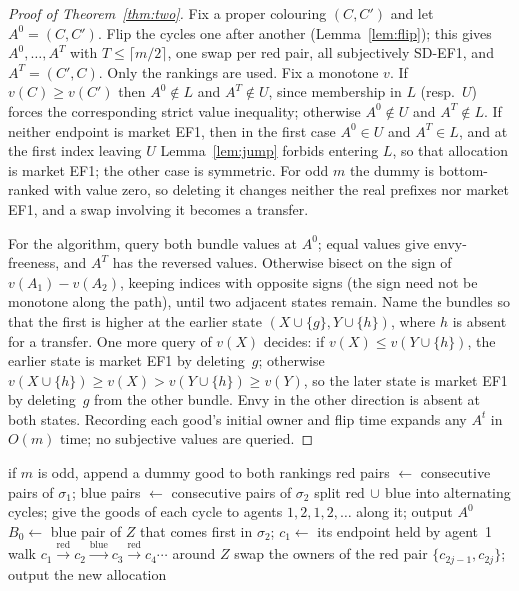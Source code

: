 \documentclass[sigconf,anonymous]{aamas}
\begin{document}
\begin{proof}[Proof of Theorem~\ref{thm:two}]
Fix a proper colouring $(C,C')$ and let $A^0=(C,C')$. Flip the cycles one after another (Lemma~\ref{lem:flip}); this gives $A^0,\dots,A^T$ with $T\le\lceil m/2\rceil$, one swap per red pair, all subjectively SD-EF1, and $A^T=(C',C)$. Only the rankings are used. Fix a monotone $v$. If $v(C)\ge v(C')$ then $A^0\notin L$ and $A^T\notin U$, since membership in $L$ (resp.\ $U$) forces the corresponding strict value inequality; otherwise $A^0\notin U$ and $A^T\notin L$. If neither endpoint is market EF1, then in the first case $A^0\in U$ and $A^T\in L$, and at the first index leaving $U$ Lemma~\ref{lem:jump} forbids entering $L$, so that allocation is market EF1; the other case is symmetric. For odd $m$ the dummy is bottom-ranked with value zero, so deleting it changes neither the real prefixes nor market EF1, and a swap involving it becomes a transfer.

For the algorithm, query both bundle values at $A^0$; equal values give envy-freeness, and $A^T$ has the reversed values. Otherwise bisect on the sign of $v(A_1)-v(A_2)$, keeping indices with opposite signs (the sign need not be monotone along the path), until two adjacent states remain. Name the bundles so that the first is higher at the earlier state $(X\cup\{g\},Y\cup\{h\})$, where $h$ is absent for a transfer. One more query of $v(X)$ decides: if $v(X)\le v(Y\cup\{h\})$, the earlier state is market EF1 by deleting~$g$; otherwise $v(X\cup\{h\})\ge v(X)>v(Y\cup\{h\})\ge v(Y)$, so the later state is market EF1 by deleting~$g$ from the other bundle. Envy in the other direction is absent at both states. Recording each good's initial owner and flip time expands any $A^t$ in $O(m)$ time; no subjective values are queried.
\end{proof}

\begin{algorithm}[t]
\caption{\textsc{ReversalPath}$(\sigma_1,\sigma_2)$ (rankings only)}\label{alg:path}
\begin{algorithmic}[1]
\STATE if $m$ is odd, append a dummy good to both rankings
\STATE red pairs $\gets$ consecutive pairs of $\sigma_1$; blue pairs $\gets$ consecutive pairs of $\sigma_2$
\STATE split red$\,\cup\,$blue into alternating cycles; give the goods of each cycle to agents $1,2,1,2,\dots$ along it; output $A^0$
  \STATE $B_0\gets$ blue pair of $Z$ that comes first in $\sigma_2$; $c_1\gets$ its endpoint held by agent~1
  \STATE walk $c_1\xrightarrow{\text{red}}c_2\xrightarrow{\text{blue}}c_3\xrightarrow{\text{red}}c_4\cdots$ around $Z$
     \STATE swap the owners of the red pair $\{c_{2j-1},c_{2j}\}$; output the new allocation
  \ENDFOR
\ENDFOR
\end{algorithmic}
\end{algorithm}
\end{document}
